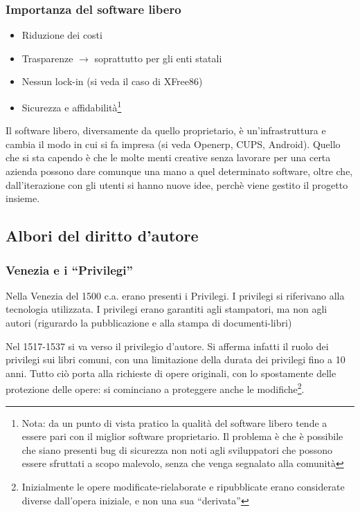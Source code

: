 \subsubsection{Importanza del software libero}

\begin{itemize}

\item Riduzione dei costi

\item Trasparenze $\to$ soprattutto per gli enti statali

\item Nessun lock-in (si veda il caso di XFree86)

\item Sicurezza e affidabilit\`a\footnote{Nota: da un punto di vista pratico la qualit\`a del software libero tende a essere pari con il miglior software proprietario. Il problema \`e che \`e possibile che siano presenti bug di sicurezza non noti agli sviluppatori che possono essere sfruttati a scopo malevolo, senza che venga segnalato alla comunit\`a}

\end{itemize}

Il software libero, diversamente da quello proprietario, \`e un'infrastruttura e cambia il modo in cui si fa impresa (si veda Openerp, CUPS, Android). Quello che si sta capendo \`e che le molte menti creative senza lavorare per una certa azienda possono dare comunque una mano a quel determinato software, oltre che, dall'iterazione con gli utenti si hanno nuove idee, perch\`e viene gestito il progetto insieme.

\subsection{Albori del diritto d'autore}

\subsubsection{Venezia e i ``Privilegi''}

Nella Venezia del 1500 c.a. erano presenti i Privilegi. I privilegi si riferivano alla tecnologia utilizzata. I privilegi erano garantiti agli stampatori, ma non agli autori (rigurardo la pubblicazione e alla stampa di documenti-libri)

Nel 1517-1537 si va verso il privilegio d'autore. Si afferma infatti il ruolo dei privilegi sui libri comuni, con una limitazione della durata dei privilegi fino a 10 anni. Tutto ci\`o porta alla richieste di opere originali, con lo spostamente delle protezione delle opere: si cominciano a proteggere anche le modifiche\footnote{Inizialmente le opere modificate-rielaborate e ripubblicate erano considerate diverse dall'opera iniziale, e non una sua ``derivata''}.

